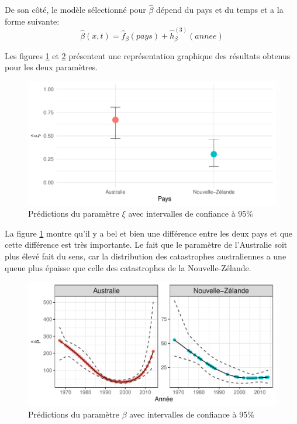 De son côté, le modèle sélectionné pour $\hat\beta$ dépend du pays et du temps et a la forme suivante:
\begin{equation}\label{eq:3.3.3}
\hat\beta(x,t) = \hat{f}_\beta(pays) + \hat{h}^{(3)}_\beta(annee)
\end{equation}



Les figures \ref{fig:3.8} et \ref{fig:3.9} présentent une représentation graphique des résultats obtenus pour les deux paramètres.
\begin{figure}[h]
\begin{center}
\includegraphics{images/fig-015}
\end{center}
\caption{Prédictions du paramètre $\xi$ avec intervalles de confiance à 95\%}
\label{fig:3.8}
\end{figure}

La figure \ref{fig:3.8} montre qu'il y a bel et bien une différence entre les deux pays et que cette différence est très importante. Le fait que le paramètre de l'Australie soit plus élevé fait du sens, car la distribution des catastrophes australiennes a une queue plus épaisse que celle des catastrophes de la Nouvelle-Zélande. 
\\

\begin{figure}[h]
\begin{center}
\includegraphics{images/fig-016}
\end{center}
\caption{Prédictions du paramètre $\beta$ avec intervalles de confiance à 95\%}
\label{fig:3.9}
\end{figure}

